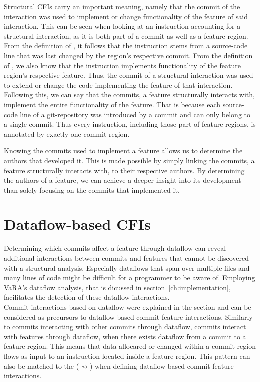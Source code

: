 Structural CFIs carry an important meaning, namely that the commit of the interaction was used to implement or change functionality of the feature of said interaction.
This can be seen when looking at an instruction accounting for a structural interaction, as it is both part of a commit as well as a feature region.
From the definition of , it follows that the instruction stems from a source-code line that was last changed by the region's respective commit. 
From the definition of , we also know that the instruction implements functionality of the feature region's respective feature. 
Thus, the commit of a structural interaction was used to extend or change the code implementing the feature of that interaction.
Following this, we can say that the commits, a feature structurally interacts with, implement the entire functionality of the feature.
That is because each source-code line of a git-repository was introduced by a commit and can only belong to a single commit.
Thus every instruction, including those part of feature regions, is annotated by exactly one commit region. 

Knowing the commits used to implement a feature allows us to determine the authors that developed it.
This is made possible by simply linking the commits, a feature structurally interacts with, to their respective authors.
By determining the authors of a feature, we can achieve a deeper insight into its development than solely focusing on the commits that implemented it. 

\section{Dataflow-based CFIs}\label{sec:dataflow_cfis}

Determining which commits affect a feature through dataflow can reveal additional interactions between commits and features that cannot be discovered with a structural analysis.
Especially dataflows that span over multiple files and many lines of code might be difficult for a programmer to be aware of.
Employing VaRA's dataflow analysis, that is dicussed in section~\ref{ch:implementation}, facilitates the detection of these dataflow interactions. \\
Commit interactions based on dataflow were explained in the  section and can be considered as precursors to dataflow-based commit-feature interactions.
Similarly to commits interacting with other commits through dataflow, commits interact with features through dataflow, when there exists dataflow from a commit to a feature region.
This means that data allocared or changed within a commit region flows as input to an instruction located inside a feature region.
This pattern can also be matched to the  ($\rightsquigarrow$) when defining dataflow-based commit-feature interactions.

